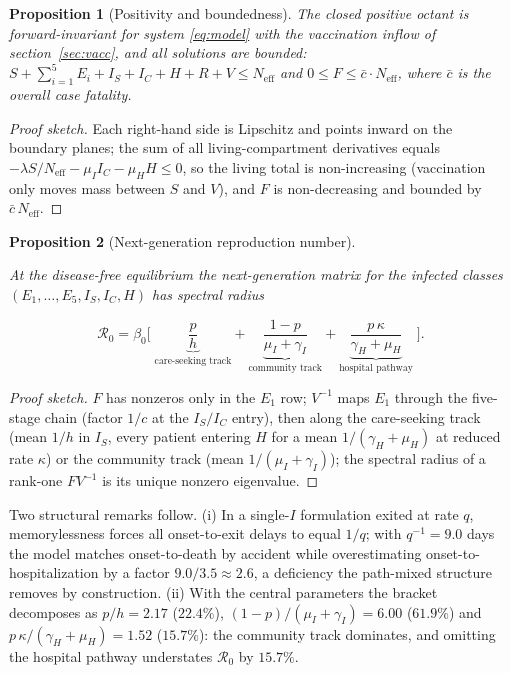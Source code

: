 \documentclass[preprint,12pt,numbers]{elsarticle}
\newtheorem{proposition}{Proposition}
\newcommand{\Reff}{\mathcal{R}}
\begin{document}
\begin{proposition}[Positivity and boundedness]\label{prop:pos}
The closed positive octant is forward-invariant for system
\eqref{eq:model} with the vaccination inflow of section~\ref{sec:vacc},
and all solutions are bounded:
$S+\sum_{i=1}^{5}E_i+I_S+I_C+H+R+V\le N_{\mathrm{eff}}$ and $0\le F\le
\bar c\cdot N_{\mathrm{eff}}$, where $\bar c$ is the overall case
fatality.
\end{proposition}
\begin{proof}[Proof sketch]
\begin{sloppypar}
Each right-hand side is Lipschitz and points inward on the boundary
planes; the sum of all living-compartment derivatives equals
$-\lambda S/N_{\mathrm{eff}}-\mu_I I_C-\mu_H H\le0$, so the living total
is non-increasing (vaccination only moves mass between $S$ and $V$), and
$F$ is non-decreasing and bounded by $\bar c\,N_{\mathrm{eff}}$.
\end{sloppypar}
\end{proof}

\begin{proposition}[Next-generation reproduction number]\label{prop:ngm}
\begin{sloppypar}
At the disease-free equilibrium the next-generation matrix for the
infected classes $(E_1,\dots,E_5,I_S,I_C,H)$ has spectral radius
\end{sloppypar}
\begin{equation}\label{eq:R0}
\Reff_0=\beta_0\Bigg[\;\underbrace{\frac{p}{h}}_{\text{care-seeking track}}
+\underbrace{\frac{1-p}{\mu_I+\gamma_I}}_{\text{community track}}
+\underbrace{\frac{p\,\kappa}{\gamma_H+\mu_H}}_{\text{hospital pathway}}\;\Bigg].
\end{equation}
\end{proposition}
\begin{proof}[Proof sketch]
$F$ has nonzeros only in the $E_1$ row; $V^{-1}$ maps $E_1$ through the
five-stage chain (factor $1/c$ at the $I_S/I_C$ entry), then along the
care-seeking track (mean $1/h$ in $I_S$, every patient entering $H$ for a
mean $1/(\gamma_H+\mu_H)$ at reduced rate $\kappa$) or the community
track (mean $1/(\mu_I+\gamma_I)$); the spectral radius of a rank-one
$FV^{-1}$ is its unique nonzero eigenvalue.
\end{proof}

Two structural remarks follow. (i) In a single-$I$ formulation exited at
rate $q$, memorylessness forces all onset-to-exit delays to equal $1/q$;
with $q^{-1}=9.0$ days the model matches onset-to-death by accident while
overestimating onset-to-hospitalization by a factor $9.0/3.5\approx2.6$,
a deficiency the path-mixed structure removes by construction. (ii) With
the central parameters the bracket decomposes as $p/h=2.17$ ($22.4\%$),
$(1-p)/(\mu_I+\gamma_I)=6.00$ ($61.9\%$) and
$p\,\kappa/(\gamma_H+\mu_H)=1.52$ ($15.7\%$): the community track
dominates, and omitting the hospital pathway understates $\Reff_0$ by
$15.7\%$.
\end{document}

